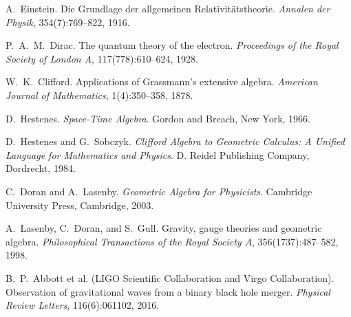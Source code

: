 \documentclass[11pt,a4paper]{article}
\numberwithin{equation}{section}
\theoremstyle{plain}
\theoremstyle{definition}
\theoremstyle{remark}
\begin{document}

\begin{thebibliography}{9}

A.~Einstein.
\newblock Die Grundlage der allgemeinen Relativitätstheorie.
\newblock \emph{Annalen der Physik}, 354(7):769--822, 1916.

P.~A.~M.~Dirac.
\newblock The quantum theory of the electron.
\newblock \emph{Proceedings of the Royal Society of London A}, 117(778):610--624, 1928.

W.~K.~Clifford.
\newblock Applications of Grassmann's extensive algebra.
\newblock \emph{American Journal of Mathematics}, 1(4):350--358, 1878.

D.~Hestenes.
\newblock \emph{Space-Time Algebra}.
\newblock Gordon and Breach, New York, 1966.

D.~Hestenes and G.~Sobczyk.
\newblock \emph{Clifford Algebra to Geometric Calculus: A Unified Language for Mathematics and Physics}.
\newblock D. Reidel Publishing Company, Dordrecht, 1984.

C.~Doran and A.~Lasenby.
\newblock \emph{Geometric Algebra for Physicists}.
\newblock Cambridge University Press, Cambridge, 2003.

A.~Lasenby, C.~Doran, and S.~Gull.
\newblock Gravity, gauge theories and geometric algebra.
\newblock \emph{Philosophical Transactions of the Royal Society A}, 356(1737):487--582, 1998.

B.~P.~Abbott et al. (LIGO Scientific Collaboration and Virgo Collaboration).
\newblock Observation of gravitational waves from a binary black hole merger.
\newblock \emph{Physical Review Letters}, 116(6):061102, 2016.

\end{thebibliography}
\end{document}
